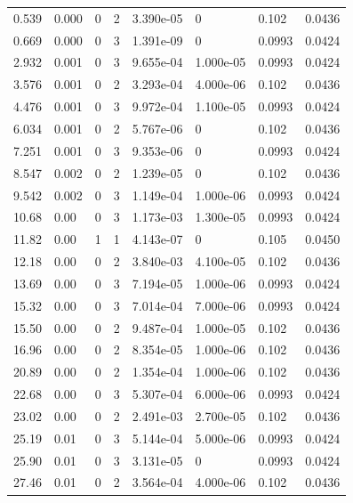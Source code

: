 \documentclass[preview]{standalone}
\begin{document}
{{\begin{tabular}{L{1.2cm}C{1.2cm} C{0.3cm}C{0.5cm} C{1.4cm}C{1.4cm} C{1.4cm}C{1.4cm}}
  0.539  &  0.000  & 0     &  2 &  3.390e-05  & 0  & 0.102 &  0.0436   \\ 
  0.669  &  0.000  & 0     &  3 &  1.391e-09  & 0  & 0.0993 &  0.0424   \\ 
  2.932  &  0.001  & 0     &  3 &  9.655e-04  & 1.000e-05  & 0.0993 &  0.0424   \\ 
  3.576  &  0.001  & 0     &  2 &  3.293e-04  & 4.000e-06  & 0.102 &  0.0436   \\ 
  4.476  &  0.001  & 0     &  3 &  9.972e-04  & 1.100e-05  & 0.0993 &  0.0424   \\ 
  6.034  &  0.001  & 0     &  2 &  5.767e-06  & 0  & 0.102 &  0.0436   \\ 
  7.251  &  0.001  & 0     &  3 &  9.353e-06  & 0  & 0.0993 &  0.0424   \\ 
  8.547  &  0.002  & 0     &  2 &  1.239e-05  & 0  & 0.102 &  0.0436   \\ 
  9.542  &  0.002  & 0     &  3 &  1.149e-04  & 1.000e-06  & 0.0993 &  0.0424   \\ 
  10.68  &  0.00  & 0     &  3 &  1.173e-03  & 1.300e-05  & 0.0993 &  0.0424   \\ 
  11.82  &  0.00  & 1     &  1 &  4.143e-07  & 0  & 0.105 &  0.0450   \\ 
  12.18  &  0.00  & 0     &  2 &  3.840e-03  & 4.100e-05  & 0.102 &  0.0436   \\ 
  13.69  &  0.00  & 0     &  3 &  7.194e-05  & 1.000e-06  & 0.0993 &  0.0424   \\ 
  15.32  &  0.00  & 0     &  3 &  7.014e-04  & 7.000e-06  & 0.0993 &  0.0424   \\ 
  15.50  &  0.00  & 0     &  2 &  9.487e-04  & 1.000e-05  & 0.102 &  0.0436   \\ 
  16.96  &  0.00  & 0     &  2 &  8.354e-05  & 1.000e-06  & 0.102 &  0.0436   \\ 
  20.89  &  0.00  & 0     &  2 &  1.354e-04  & 1.000e-06  & 0.102 &  0.0436   \\ 
  22.68  &  0.00  & 0     &  3 &  5.307e-04  & 6.000e-06  & 0.0993 &  0.0424   \\ 
  23.02  &  0.00  & 0     &  2 &  2.491e-03  & 2.700e-05  & 0.102 &  0.0436   \\ 
  25.19  &  0.01  & 0     &  3 &  5.144e-04  & 5.000e-06  & 0.0993 &  0.0424   \\ 
  25.90  &  0.01  & 0     &  3 &  3.131e-05  & 0  & 0.0993 &  0.0424   \\ 
  27.46  &  0.01  & 0     &  2 &  3.564e-04  & 4.000e-06  & 0.102 &  0.0436   \\ 

\end{tabular}}}
\end{document}
